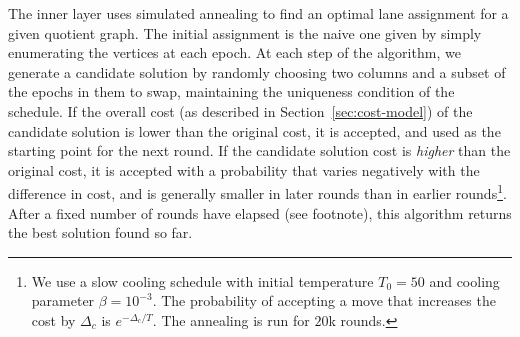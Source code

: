     
The inner layer uses simulated annealing to find an optimal lane assignment for a given quotient graph.
The initial assignment is the naive one given by simply enumerating the vertices at each epoch.
At each step of the algorithm, we generate a candidate solution by randomly choosing two columns and a subset of the epochs in them to swap, maintaining the uniqueness condition of the schedule.
If the overall cost (as described in Section~\ref{sec:cost-model})
of the candidate solution is lower than the original cost, it is accepted, and used as the starting point for the next round.
If the candidate solution cost is {\em higher} than the original cost, it is accepted with a probability that varies negatively with the difference in cost, and is generally smaller in later rounds than in earlier rounds\footnote{We use a slow cooling schedule with initial temperature $T_0=50$ and cooling parameter $\beta=10^{-3}$. The probability of accepting a move that increases the cost by $\Delta_c$ is $e^{-\Delta_c/T}$. The annealing is run for $20$k rounds.}.
After a fixed number of rounds have elapsed (see footnote), this algorithm returns the best solution found so far.

